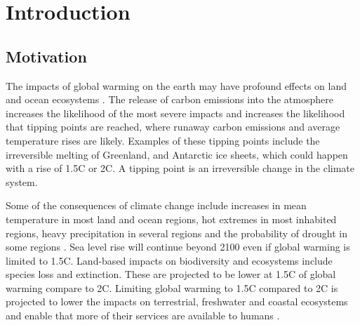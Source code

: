
\chapter{Introduction}  %
\label{chapter:intro}


\ifpdf
\graphicspath{{Chapter1/Figs/Raster/}{Chapter1/Figs/PDF/}{Chapter1/Figs/}}
\else
\graphicspath{{Chapter1/Figs/Vector/}{Chapter1/Figs/}}
\fi


\section{Motivation} %


The impacts of global warming on the earth may have profound effects on land and ocean ecosystems \cite{IPCC2018}. The release of carbon emissions into the atmosphere increases the likelihood of the most severe impacts and increases the likelihood that tipping points are reached, where runaway carbon emissions and average temperature rises are likely. Examples of these tipping points include the irreversible melting of Greenland, and Antarctic ice sheets, which could happen with a rise of 1.5\degree C or 2\degree C. A tipping point is an irreversible change in the climate system.

Some of the consequences of climate change include increases in mean temperature in most land and ocean regions, hot extremes in most inhabited regions, heavy precipitation in several regions and the probability of drought in some regions \cite{IPCC2018}. Sea level rise will continue beyond 2100 even if global warming is limited to 1.5\degree C. Land-based impacts on biodiversity and ecosystems include species loss and extinction. These are projected to be lower at 1.5\degree C of global warming compare to 2\degree C. Limiting global warming to 1.5\degree C compared to 2\degree C is projected to lower the impacts on terrestrial, freshwater and coastal ecosystems and enable that more of their services are available to humans \cite{IPCC2018}.

